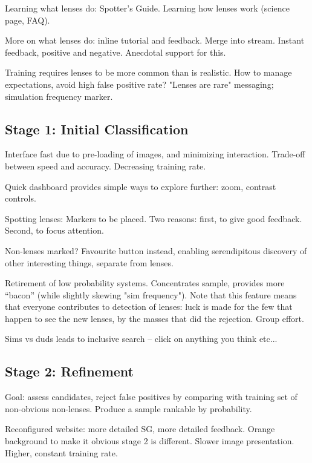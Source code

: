 \documentclass[useAMS,usenatbib,a4paper]{mn2e}
\begin{document}
Learning what lenses do: Spotter's Guide. Learning how
lenses work (science page, FAQ). 

More on what lenses do: inline tutorial and feedback. 
Merge into stream. Instant feedback, positive and
negative. Anecdotal support for this.

Training requires lenses to be more common than is realistic. How to manage
expectations, avoid high false positive rate? "Lenses are rare" messaging;
simulation frequency marker.


\subsection{Stage 1: Initial Classification}
\label{sec:design:stage1}

Interface fast due to pre-loading of images, and minimizing interaction.
Trade-off between speed and accuracy. Decreasing training rate.

Quick dashboard provides simple ways to explore further: zoom, contrast
controls.

Spotting lenses: Markers to be placed. Two reasons: first, to give good
feedback. Second, to focus attention.

Non-lenses marked? Favourite button instead, enabling serendipitous
discovery of other interesting things, separate from lenses.

Retirement of low probability systems. Concentrates sample, provides more
``bacon'' (while slightly skewing "sim frequency"). Note that this feature
means that everyone contributes to detection of lenses: luck is made for the
few that happen to see the new lenses, by the masses that did the rejection.
Group effort.

Sims vs duds leads to inclusive search -- click on anything you think etc...


\subsection{Stage 2: Refinement}
\label{sec:design:stage2}

Goal: assess candidates, reject false positives by comparing with training set
of non-obvious non-lenses. Produce a sample rankable by probability.

Reconfigured website: more detailed SG, more detailed feedback. Orange
background to make it obvious stage 2 is different. Slower image presentation.
Higher, constant training rate.
\end{document}
